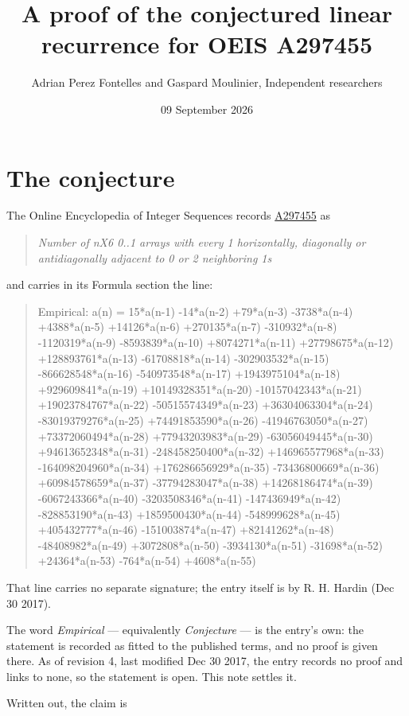 \documentclass[11pt]{article}
\title{A proof of the conjectured linear recurrence for OEIS A297455}
\author{Adrian Perez Fontelles and Gaspard Moulinier, Independent researchers}
\date{09 September 2026}
\theoremstyle{definition}
\begin{document}
\maketitle
\section{The conjecture}

The Online Encyclopedia of Integer Sequences records \href{https://oeis.org/A297455}{A297455} as

\begin{quote}\itshape Number of nX6 0..1 arrays with every 1 horizontally, diagonally or antidiagonally adjacent to 0 or 2 neighboring 1s\end{quote}

and carries in its Formula section the line:

\begin{quote}\ttfamily Empirical: a(n) = 15*a(n-1) -14*a(n-2) +79*a(n-3) -3738*a(n-4) +4388*a(n-5) +14126*a(n-6) +270135*a(n-7) -310932*a(n-8) -1120319*a(n-9) -8593839*a(n-10) +8074271*a(n-11) +27798675*a(n-12) +128893761*a(n-13) -61708818*a(n-14) -302903532*a(n-15) -866628548*a(n-16) -540973548*a(n-17) +1943975104*a(n-18) +929609841*a(n-19) +10149328351*a(n-20) -10157042343*a(n-21) +19023784767*a(n-22) -50515574349*a(n-23) +36304063304*a(n-24) -83019379276*a(n-25) +74491853590*a(n-26) -41946763050*a(n-27) +73372060494*a(n-28) +77943203983*a(n-29) -63056049445*a(n-30) +94613652348*a(n-31) -248458250400*a(n-32) +146965577968*a(n-33) -164098204960*a(n-34) +176286656929*a(n-35) -73436800669*a(n-36) +60984578659*a(n-37) -37794283047*a(n-38) +14268186474*a(n-39) -6067243366*a(n-40) -3203508346*a(n-41) -147436949*a(n-42) -828853190*a(n-43) +1859500430*a(n-44) -548999628*a(n-45) +405432777*a(n-46) -151003874*a(n-47) +82141262*a(n-48) -48408982*a(n-49) +3072808*a(n-50) -3934130*a(n-51) -31698*a(n-52) +24364*a(n-53) -764*a(n-54) +4608*a(n-55)\end{quote}

That line carries no separate signature; the entry itself is by R. H. Hardin (Dec 30 2017).

The word {\itshape Empirical} --- equivalently {\itshape Conjecture} --- is the entry's own: the statement is recorded as fitted to the published terms, and no proof is given there. As of revision 4, last modified Dec 30 2017, the entry records no proof and links to none, so the statement is open. This note settles it.

Written out, the claim is
\end{document}
